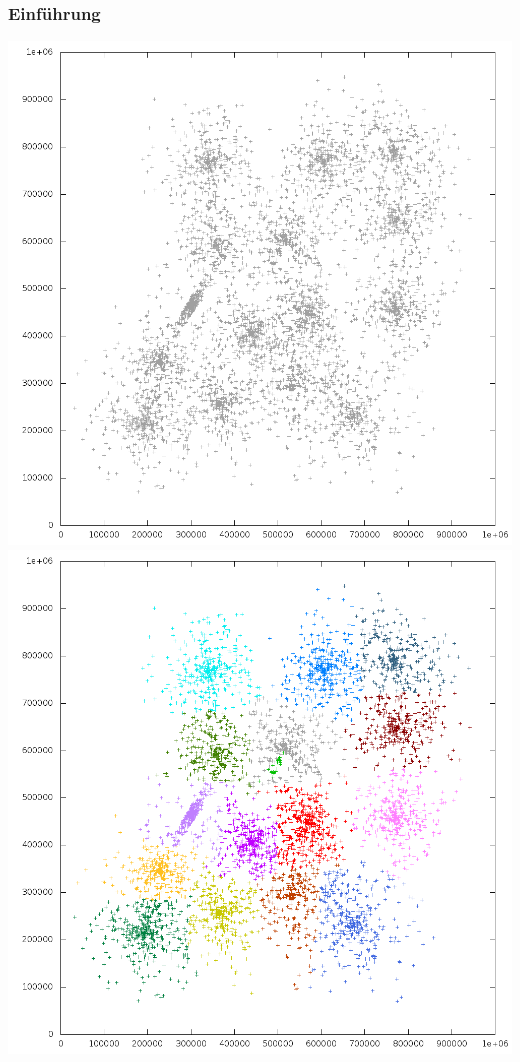 \documentclass[10pt]{beamer}
\begin{document}
\begin{frame}
	\frametitle{Einf\"uhrung}
	\includegraphics[scale=0.22, keepaspectratio]{../output/pics/s3_black.png}
	\includegraphics[scale=0.22, keepaspectratio]{../output/pics/s3_colored.png}
\end{frame}
\end{document}

